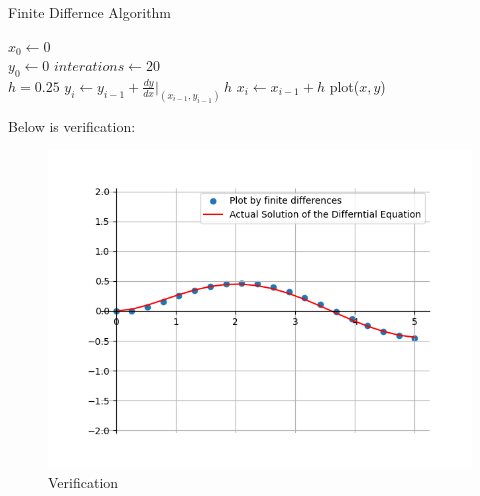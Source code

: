 \documentclass[journal]{IEEEtran}
\begin{document}
\begin{enumerate}
    
    \begin{algorithm}[!h]
        \caption{Finite Differnce Algorithm}
        \begin{algorithmic}
            \STATE {} $x_0 \gets 0$\\
            \STATE $y_0 \gets 0$
            \STATE {} $interations \gets 20$\\
            \STATE {} $h = 0.25$
                \STATE $\displaystyle y_{i} \gets y_{i-1} + \frac{dy}{dx}|_{(x_{i-1}, y_{i-1})} \, h$
                \STATE $x_i \gets x_{i-1} + h$
            \ENDFOR
            \STATE plot($x, y$)
        \end{algorithmic}
    \end{algorithm}
    Below is verification:
    \begin{figure}[!h]  %
        \centering  %
        \includegraphics[width=\columnwidth]{figs/fig1.png}  
        \caption{Verification}
    \end{figure}


\end{enumerate}
\end{document}

